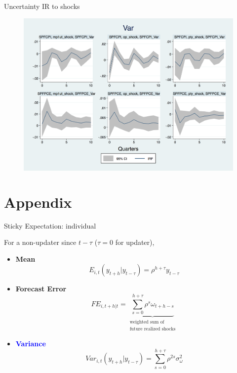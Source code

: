 \documentclass{beamer}
\begin{document}
\begin{frame}{Uncertainty IR to shocks}

\begin{figure}
	\includegraphics[scale=0.3]{figures/SPFVar_ashocks.png} 
\end{figure}

\end{frame}





\section{Appendix}




\begin{frame}{Sticky Expectation: individual}

For a non-updater since $t-\tau$ ($\tau=0$ for updater),
\begin{itemize}
\item \textbf{Mean} $$E_{i,t}(y_{t+h}|y_{t-\tau}) = \rho^{h+\tau} y_{t-\tau}$$  
\item \textbf{Forecast Error} $$FE_{i,t+h|t} = \underbrace{\sum^{h+\tau}_{s=0} \rho^s \omega_{t+h-s}}_{\substack{\text{weighted sum of} \\ \text{future realized shocks}} }$$
\item \textcolor{blue}{\textbf{Variance}} $$Var_{i,t}(y_{t+h}|y_{t-\tau}) = \sum^{h+\tau}_{s=0}\rho^{2s} \sigma^2_{\omega}$$	
\end{itemize}

\end{frame}
\end{document}
